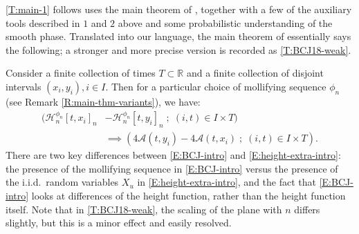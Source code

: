 \documentclass[11pt,twoside]{amsart}
\theoremstyle{plain}
\numberwithin{quest}{section}
\theoremstyle{remark}
\numberwithin{rem}{section}
\theoremstyle{definition}
\newcommand{\R}{\mathbb{R}}
\newcommand{\cA}{\mathcal{A}}
\newcommand{\cH}{\mathcal{H}}
\begin{document}
	\cref{T:main-1} follows uses the main theorem of \cite{BCJ18}, together with a few of the auxiliary tools described in $1$ and $2$ above and some probabilistic understanding of the smooth phase. Translated into our language, the main theorem of \cite{BCJ18} essentially says the following; a stronger and more precise version is recorded as \cref{T:BCJ18-weak}.
    
    Consider a finite collection of times $T \subset \R$ and a finite collection of disjoint intervals $(x_i, y_i), i \in I$. Then for a particular choice of mollifying sequence $\phi_n$ (see Remark \ref{R:main-thm-variants}), we have:
	\begin{equation}
		\label{E:BCJ-intro}
		\begin{split}(\cH^{\phi_n}_n[t, x_i]_n &- \cH^{\phi_n}_n[t, y_i]_n \;;\; (i, t) \in I \times T) \\
			&\implies (4\cA(t, y_i) - 4\cA(t, x_i) \;;\;  (i, t) \in I \times T).
		\end{split}
	\end{equation}
	There are two key differences between \eqref{E:BCJ-intro} and \eqref{E:height-extra-intro}: the presence of the mollifying sequence in \eqref{E:BCJ-intro} versus the presence of the i.i.d.\ random variables $X_u$ in \eqref{E:height-extra-intro}, and the fact that \eqref{E:BCJ-intro} looks at differences of the height function, rather than the height function itself. Note that in \cref{T:BCJ18-weak}, the scaling of the plane with $n$ differs slightly, but this is a minor effect and easily resolved.
	
\end{document}
